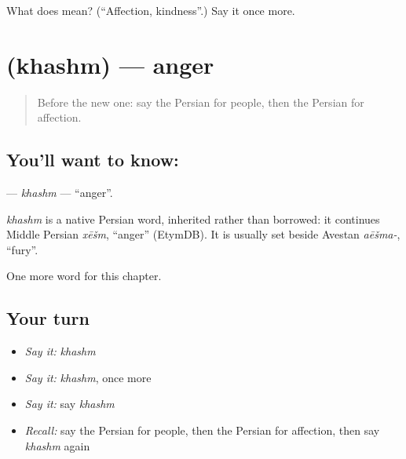 \begin{tcolorbox}[breakable,colback=teal!4,colframe=teal!35!black,title={Before you move on}]
What does  mean? (\textquotedblleft{}Affection, kindness\textquotedblright{}.) Say it once more.
\end{tcolorbox}
\section[\texorpdfstring{\fa{خشم} (khashm)}{خشم (khashm)}]{ (khashm) — anger}

\label{lesson:FA-C170-khashm}



\begin{quote}
Before the new one: say the Persian for people, then the Persian for affection.
\end{quote}

\subsection*{You'll want to know: }
\textbf{} — \emph{khashm} — \textquotedblleft{}anger\textquotedblright{}.

\begin{cousinweb}
\emph{khashm} is a native Persian word, inherited rather than borrowed: it continues Middle Persian \emph{xēšm}, \textquotedblleft{}anger\textquotedblright{} (EtymDB). It is usually set beside Avestan \emph{aēšma-}, \textquotedblleft{}fury\textquotedblright{}.
\end{cousinweb}

\begin{grammarlens}[title={What you've built}]
One more word for this chapter.
\end{grammarlens}

\subsection*{Your turn}
\begin{itemize}
\raggedright
  \item \emph{Say it:} \emph{khashm}
  \item \emph{Say it:} \emph{khashm}, once more
  \item \emph{Say it:} say \emph{khashm}
  \item \emph{Recall:} say the Persian for people, then the Persian for affection, then say \emph{khashm} again
\end{itemize}

